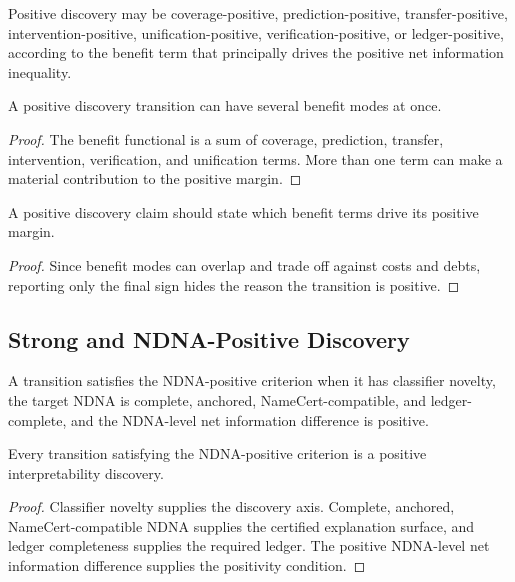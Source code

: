 \begin{definition}
\label{def:philosophy-positive-discovery-benefit-modes}
Positive discovery may be coverage-positive, prediction-positive,
transfer-positive, intervention-positive, unification-positive,
verification-positive, or ledger-positive, according to the benefit term
that principally drives the positive net information inequality.
\end{definition}

\begin{theorem}
\label{thm:philosophy-positive-benefit-modes-overlap}
A positive discovery transition can have several benefit modes at once.
\end{theorem}
\begin{proof}
The benefit functional is a sum of coverage, prediction, transfer,
intervention, verification, and unification terms. More than one term can
make a material contribution to the positive margin.
\end{proof}

\begin{corollary}
\label{cor:philosophy-positive-discovery-report-benefit-structure}
A positive discovery claim should state which benefit terms drive its
positive margin.
\end{corollary}
\begin{proof}
Since benefit modes can overlap and trade off against costs and debts,
reporting only the final sign hides the reason the transition is
positive.
\end{proof}

\subsection{Strong and NDNA-Positive Discovery}
\label{subsec:philosophy-strong-ndna-positive-discovery}

\begin{definition}
\label{def:philosophy-ndna-positive-discovery-criterion}
A transition satisfies the NDNA-positive criterion when it has classifier
novelty, the target NDNA is complete, anchored, NameCert-compatible, and
ledger-complete, and the NDNA-level net information difference is
positive.
\end{definition}

\begin{theorem}
\label{thm:philosophy-ndna-positive-criterion-implies-positive-discovery}
Every transition satisfying the NDNA-positive criterion is a positive
interpretability discovery.
\end{theorem}
\begin{proof}
Classifier novelty supplies the discovery axis. Complete, anchored,
NameCert-compatible NDNA supplies the certified explanation surface, and
ledger completeness supplies the required ledger. The positive NDNA-level
net information difference supplies the positivity condition.
\end{proof}

